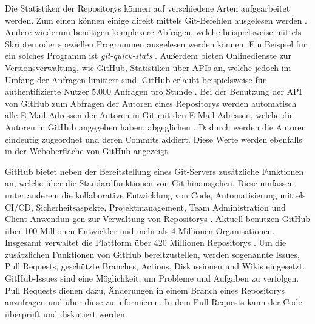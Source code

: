 Die Statistiken der Repositorys können auf verschiedene Arten aufgearbeitet werden.
Zum einen können einige direkt mittels Git-Befehlen ausgelesen werden \autocite{chacon_git_2024}.
Andere wiederum benötigen komplexere Abfragen, welche beispielsweise mittels Skripten oder speziellen Programmen ausgelesen werden können.
Ein Beispiel für ein solches Programm ist \emph{git-quick-stats} \autocite{mestan_git-quick-stats_2024}.
Außerdem bieten Onlinedienste zur Versionsverwaltung, wie GitHub, Statistiken über APIs an, welche jedoch im Umfang der Anfragen limitiert sind.
GitHub erlaubt beispielsweise für authentifizierte Nutzer 5.000 Anfragen pro Stunde \autocite{github_rate_2022}.
Bei der Benutzung der API von GitHub zum Abfragen der Autoren eines Repositorys werden automatisch alle E-Mail-Adressen der Autoren in Git mit den E-Mail-Adressen, welche die Autoren in GitHub angegeben haben, abgeglichen \autocite{github_rest-api-endpunkte_2022}.
Dadurch werden die Autoren eindeutig zugeordnet und deren Commits addiert.
Diese Werte werden ebenfalls in der Weboberfläche von GitHub angezeigt.

GitHub bietet neben der Bereitstellung eines Git-Servers zusätzliche Funktionen an, welche über die Standardfunktionen von Git hinausgehen.
Diese umfassen unter anderem die kollaborative Entwicklung von Code, Automatisierung mittels CI/CD, Sicherheitsaspekte, Projektmanagement, Team Administration und Client-Anwendun-gen zur Verwaltung von Repositorys \autocite{ponuthorai_version_2022}.
Aktuell benutzen GitHub über 100 Millionen Entwickler und mehr als 4 Millionen Organisationen.
Insgesamt verwaltet die Plattform über 420 Millionen Repositorys \autocite{github_about_2024}.
Um die zusätzlichen Funktionen von GitHub bereitzustellen, werden sogenannte Issues, Pull Requests, geschützte Branches, Actions, Diskussionen und Wikis eingesetzt.
GitHub-Issues sind eine Möglichkeit, um Probleme und Aufgaben zu verfolgen.
Pull Requests dienen dazu, Änderungen in einem Branch eines Repositorys anzufragen und über diese zu informieren.
In dem Pull Requests kann der Code überprüft und diskutiert werden.
